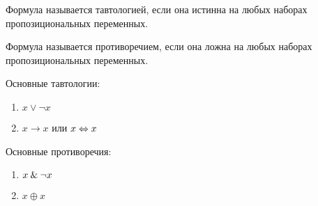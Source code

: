 \documentclass[main]{subfiles}
\begin{document}
\begin{definition}[Тавтология]
    Формула называется тавтологией, если она истинна на любых наборах пропозициональных переменных.
\end{definition}
\begin{definition}[Противоречие]
    Формула называется противоречием, если она ложна на любых наборах пропозициональных переменных.
\end{definition}
Основные тавтологии:
\begin{enumerate}
    \item $x \lor \lnot x$
    \item $x\to x$ или $x\Leftrightarrow x$
\end{enumerate}
Основные противоречия:
\begin{enumerate}
    \item $x\mathbin{\&} \lnot x$
    \item $x\oplus x$
\end{enumerate}
\end{document}
